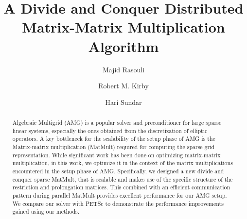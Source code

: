 \documentclass[sigconf]{acmart}
\begin{document}
%
\title[Divide and Conquer Distributed Matrix-Matrix Multiplication]{A Divide and Conquer Distributed Matrix-Matrix Multiplication Algorithm}

%
\author{Majid Rasouli}

\author{Robert M. Kirby}

\author{Hari Sundar}


\begin{abstract}
Algebraic Multigrid (AMG) is a popular solver and preconditioner for large sparse linear systems, especially the ones obtained from the discretization of elliptic operators.
A key bottleneck for the scalability of the setup phase of AMG is the Matrix-matrix multiplication (MatMult) required for computing the sparse grid representation. While significant work has been done on optimizing matrix-matrix multiplication, in this work, we optimize it in the context of the matrix multiplications encountered in the setup phase of AMG. Specifically, we designed a new divide and conquer sparse MatMult, that is scalable and makes use of the specific structure of the restriction and prolongation matrices. This combined with an efficient communication pattern during parallel MatMult provides excellent performance for our AMG setup. We compare our solver with PETSc to demonstrate the performance improvements gained using our methods.
\end{abstract}
\end{document}
